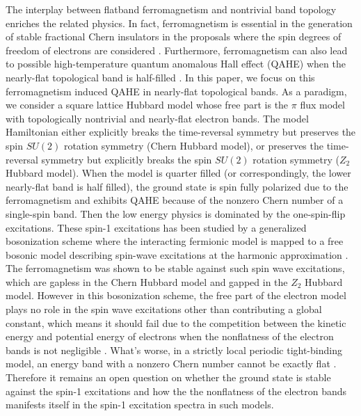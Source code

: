 \documentclass[amsmath,superscriptaddress,showpacs,aps,prb,twocolumn]{revtex4-1}
\begin{document}
\par The interplay between flatband ferromagnetism and nontrivial band topology enriches the related physics. In fact, ferromagnetism is essential in the generation of stable fractional Chern insulators in the proposals where the spin degrees of freedom of electrons are considered \cite{TMW_PRL2011,NSRCM_PRB2011,LBFL_PRL2012}. Furthermore, ferromagnetism can also lead to possible high-temperature quantum anomalous Hall effect (QAHE) when the nearly-flat topological band is half-filled \cite{NSRCM_PRL2012}. In this paper, we focus on this ferromagnetism induced QAHE in nearly-flat topological bands. As a paradigm, we consider a square lattice Hubbard model whose free part is the $\pi$ flux model with topologically nontrivial and nearly-flat electron bands. The model Hamiltonian either explicitly breaks the time-reversal symmetry but preserves the spin $SU(2)$ rotation symmetry (Chern Hubbard model), or preserves the time-reversal symmetry but explicitly breaks the spin $SU(2)$ rotation symmetry ($Z_2$ Hubbard model). When the model is quarter filled (or correspondingly, the lower nearly-flat band is half filled), the ground state is spin fully polarized due to the ferromagnetism and exhibits QAHE because of the nonzero Chern number of a single-spin band. Then the low energy physics is dominated by the one-spin-flip excitations. These spin-1 excitations has been studied by a generalized bosonization scheme where the interacting fermionic model is mapped to a free bosonic model describing spin-wave excitations at the harmonic approximation \cite{DG_PRB2015}. The ferromagnetism was shown to be stable against such spin wave excitations, which are gapless in the Chern Hubbard model and gapped in the $Z_2$ Hubbard model. However in this bosonization scheme, the free part of the electron model plays no role in the spin wave excitations other than contributing a global constant, which means it should fail due to the competition between the kinetic energy and potential energy of electrons when the nonflatness of the electron bands is not negligible \cite{T_PRL1994}. What's worse, in a strictly local periodic tight-binding model, an energy band with a nonzero Chern number cannot be exactly flat \cite{CMST_JPMT2014}. Therefore it remains an open question on whether the ground state is stable against the spin-1 excitations and how the the nonflatness of the electron bands manifests itself in the spin-1 excitation spectra in such models.
\end{document}
